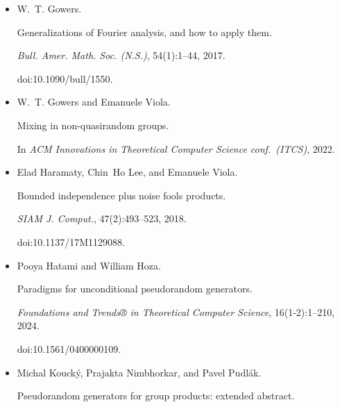 \documentclass[10pt,a4paper]{article}
\begin{document}
\begin{itemize}
Pseudorandom generators for combinatorial shapes.


\emph{SIAM J. Comput.}, 42(3):1051–1076, 2013.


doi:10.1137/110854990.





\item[] 
[21]

W. T. Gowers.


Generalizations of Fourier analysis, and how to apply them.


\emph{Bull. Amer. Math. Soc. (N.S.)}, 54(1):1–44, 2017.


doi:10.1090/bull/1550.





\item[] 
[22]

W. T. Gowers and Emanuele Viola.


Mixing in non-quasirandom groups.


In \emph{ACM Innovations in Theoretical Computer Science
conf. (ITCS)}, 2022.





\item[] 
[23]

Elad Haramaty, Chin Ho Lee, and Emanuele Viola.


Bounded independence plus noise fools products.


\emph{SIAM J. Comput.}, 47(2):493–523, 2018.


doi:10.1137/17M1129088.





\item[] 
[24]

Pooya Hatami and William Hoza.


Paradigms for unconditional pseudorandom generators.


\emph{Foundations and Trends® in Theoretical Computer Science},
16(1-2):1–210, 2024.


doi:10.1561/0400000109.





\item[] 
[25]

Michal Koucký, Prajakta Nimbhorkar, and Pavel Pudlák.


Pseudorandom generators for group products: extended abstract.



\end{itemize}
\end{document}
